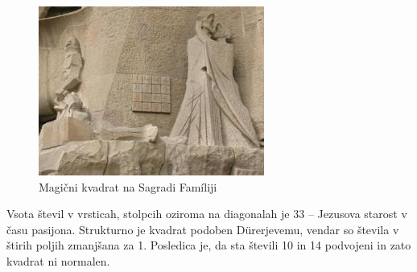\documentclass[a4paper,12pt]{article}
\theoremstyle{definition}
\theoremstyle{plain}
\begin{document}
\begin{figure}[]
   \centering
   \includegraphics[scale=.45]{sagrada.png}
   \caption{Magični kvadrat na Sagradi Famíliji}
   \label{pic:Sagrada}
\end{figure}
Vsota števil v vrsticah, stolpcih oziroma na diagonalah je 33 -- Jezusova starost
v času pasijona. Strukturno je kvadrat podoben Dürerjevemu, vendar so števila
v štirih poljih zmanjšana za 1. Posledica je, da sta števili 10 in 14 podvojeni
in zato kvadrat ni normalen.

\end{document}
